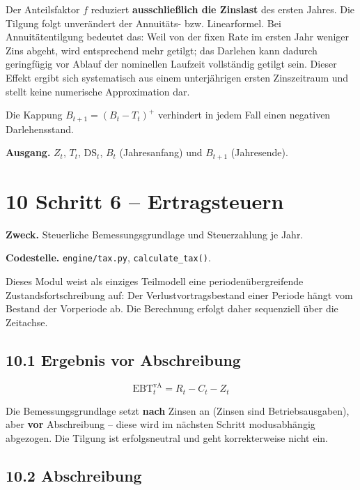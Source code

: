 \documentclass[
  a4paper,
  10pt]{article}
\begin{document}
Der Anteilsfaktor \(f\) reduziert \textbf{ausschließlich die Zinslast}
des ersten Jahres. Die Tilgung folgt unverändert der Annuitäts- bzw.
Linearformel. Bei Annuitätentilgung bedeutet das: Weil von der fixen
Rate im ersten Jahr weniger Zins abgeht, wird entsprechend mehr getilgt;
das Darlehen kann dadurch geringfügig vor Ablauf der nominellen Laufzeit
vollständig getilgt sein. Dieser Effekt ergibt sich systematisch aus
einem unterjährigen ersten Zinszeitraum und stellt keine numerische
Approximation dar.

Die Kappung \(B_{t+1} = (B_t - T_t)^{+}\) verhindert in jedem Fall einen
negativen Darlehensstand.

\textbf{Ausgang.} \(Z_t\), \(T_t\), \(\mathrm{DS}_t\), \(B_t\)
(Jahresanfang) und \(B_{t+1}\) (Jahresende).

\hypertarget{schritt-6-ertragsteuern}{%
\section{10 Schritt 6 -- Ertragsteuern}\label{schritt-6-ertragsteuern}}

\textbf{Zweck.} Steuerliche Bemessungsgrundlage und Steuerzahlung je
Jahr.

\textbf{Codestelle.} \nolinkurl{engine/tax.py}, \texttt{calculate\_tax()}.

Dieses Modul weist als einziges Teilmodell eine periodenübergreifende
Zustandsfortschreibung auf: Der Verlustvortragsbestand einer Periode
hängt vom Bestand der Vorperiode ab. Die Berechnung erfolgt daher
sequenziell über die Zeitachse.

\hypertarget{ergebnis-vor-abschreibung}{%
\subsection{10.1 Ergebnis vor
Abschreibung}\label{ergebnis-vor-abschreibung}}

\[ \mathrm{EBT}^{\mathrm{vA}}_t = R_t - C_t - Z_t \]

Die Bemessungsgrundlage setzt \textbf{nach} Zinsen an (Zinsen sind
Betriebsausgaben), aber \textbf{vor} Abschreibung -- diese wird im
nächsten Schritt modusabhängig abgezogen. Die Tilgung ist erfolgsneutral
und geht korrekterweise nicht ein.

\hypertarget{abschreibung}{%
\subsection{10.2 Abschreibung}\label{abschreibung}}
\end{document}
